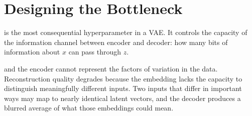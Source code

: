 \newpage
\section{Designing the Bottleneck}

 is the most consequential hyperparameter in a VAE.
It controls the capacity of the information channel between encoder and decoder:
how many bits of information about $x$ can pass through $z$.



 and the encoder cannot represent the factors of variation in the data.
Reconstruction quality degrades because the embedding lacks the capacity to distinguish meaningfully different inputs.
Two inputs that differ in important ways may map to nearly identical latent vectors,
and the decoder produces a blurred average of what those embeddings could mean.



